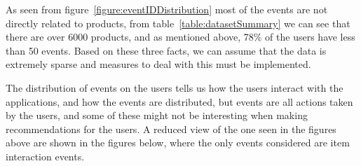         As seen from figure~\ref{figure:eventIDDistribution} most of the events are not directly related to products, from table~\ref{table:datasetSummary} we can see that there are over 6000 products, and as mentioned above, 78\% of the users have less than 50 events. Based on these three facts, we can assume that the data is extremely sparse and measures to deal with this must be implemented.

        The distribution of events on the users tells us how the users interact with the applications, and how the events are distributed, but events are all actions taken by the users, and some of these might not be interesting when making recommendations for the users.
        A reduced view of the one seen in the figures above are shown in the figures below, where the only events considered are item interaction events.

